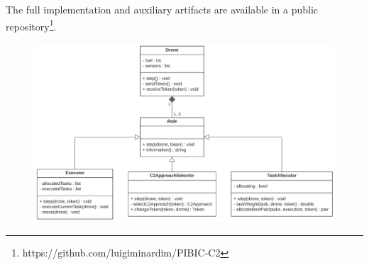 

The full implementation and auxiliary artifacts are available in a public repository\footnote{https://github.com/luigiminardim/PIBIC-C2}.

\begin{figure}[ht]
  \centering
  \includegraphics[width=0.9\linewidth]{figures/diagramaDeClasse.png}
  \label{fig:ClassDiagram}
\end{figure}



